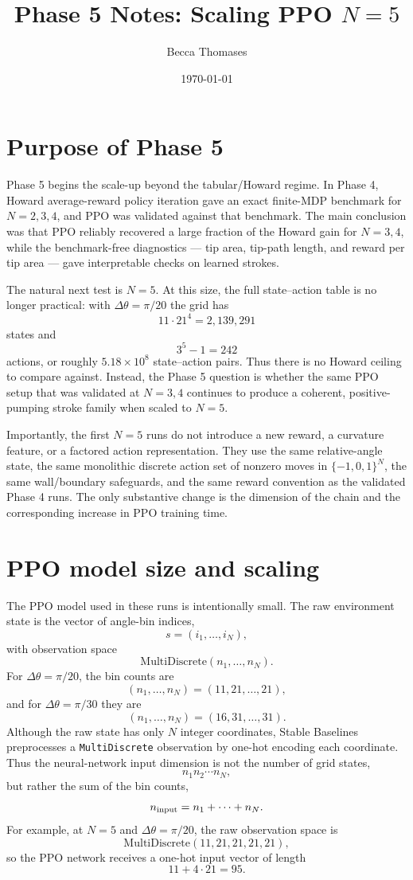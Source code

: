 \documentclass[11pt]{article}
\title{Phase 5 Notes: Scaling PPO $N=5$}
\author{Becca Thomases}
\date{\today}
\begin{document}
\maketitle

\section{Purpose of Phase 5}

Phase 5 begins the scale-up beyond the tabular/Howard regime. In Phase 4,
Howard average-reward policy iteration gave an exact finite-MDP benchmark for
$N=2,3,4$, and PPO was validated against that benchmark. The main conclusion
was that PPO reliably recovered a large fraction of the Howard gain for
$N=3,4$, while the benchmark-free diagnostics --- tip area, tip-path length,
and reward per tip area --- gave interpretable checks on learned strokes.

The natural next test is $N=5$. At this size, the full state--action table is no
longer practical: with $\Delta\theta=\pi/20$ the grid has
\[
    11\cdot 21^4 = 2{,}139{,}291
\]
states and
\[
    3^5-1 = 242
\]
actions, or roughly $5.18\times 10^8$ state--action pairs. Thus there is no
Howard ceiling to compare against. Instead, the Phase 5 question is whether the
same PPO setup that was validated at $N=3,4$ continues to produce a coherent,
positive-pumping stroke family when scaled to $N=5$.

Importantly, the first $N=5$ runs do not introduce a new reward, a curvature
feature, or a factored action representation. They use the same relative-angle
state, the same monolithic discrete action set of nonzero moves in
$\{-1,0,1\}^N$, the same wall/boundary safeguards, and the same reward
convention as the validated Phase 4 runs. The only substantive change is the
dimension of the chain and the corresponding increase in PPO training time.


\section{PPO model size and scaling}

The PPO model used in these runs is intentionally small. The raw environment
state is the vector of angle-bin indices,
\[
    s = (i_1,\ldots,i_N),
\]
with observation space
\[
    \mathrm{MultiDiscrete}(n_1,\ldots,n_N).
\]
For $\Delta\theta=\pi/20$, the bin counts are
\[
    (n_1,\ldots,n_N) = (11,21,\ldots,21),
\]
and for $\Delta\theta=\pi/30$ they are
\[
    (n_1,\ldots,n_N) = (16,31,\ldots,31).
\]
Although the raw state has only $N$ integer coordinates, Stable Baselines
preprocesses a \texttt{MultiDiscrete} observation by one-hot encoding each
coordinate. Thus the neural-network input dimension is not the number of grid
states,
\[
    n_1 n_2 \cdots n_N,
\]
but rather the sum of the bin counts,
\[
    n_{\rm input} = n_1+\cdots+n_N.
\]
For example, at $N=5$ and $\Delta\theta=\pi/20$, the raw observation space is
\[
    \mathrm{MultiDiscrete}(11,21,21,21,21),
\]
so the PPO network receives a one-hot input vector of length
\[
    11+4\cdot 21 = 95.
\]
\end{document}
